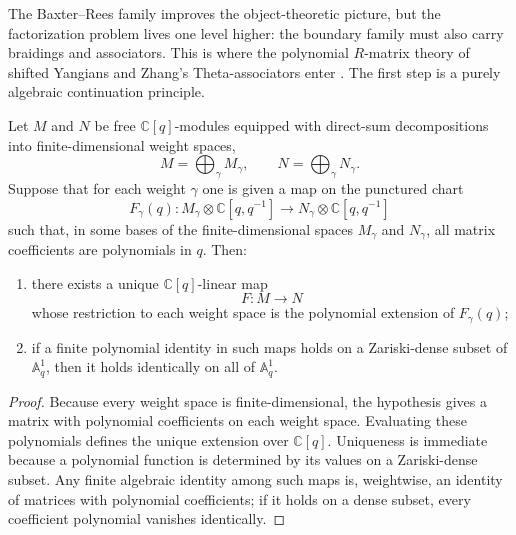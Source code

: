 The Baxter--Rees family improves the object-theoretic picture, but the
factorization problem lives one level higher: the boundary family must
also carry braidings and associators.  This is where the polynomial
$R$-matrix theory of shifted Yangians and Zhang's Theta-associators enter
\cite{HZ24,ZhangTheta24}.  The first step is a purely algebraic
continuation principle.

\begin{lemma}
\ClaimStatusProvedHere
\label{lem:weightwise-polynomial-continuation}
Let $M$ and $N$ be free $\mathbb C[q]$-modules equipped with direct-sum
decompositions into finite-dimensional weight spaces,
\begin{equation}
M=\bigoplus_{\gamma} M_\gamma,
\qquad N=\bigoplus_{\gamma} N_\gamma.
\end{equation}
Suppose that for each weight $\gamma$ one is given a map on the punctured
chart
\begin{equation}
F_\gamma(q):M_\gamma\otimes \mathbb C[q,q^{-1}]
\longrightarrow N_\gamma\otimes \mathbb C[q,q^{-1}]
\end{equation}
such that, in some bases of the finite-dimensional spaces $M_\gamma$ and
$N_\gamma$, all matrix coefficients are polynomials in $q$.  Then:
\begin{enumerate}
    \item there exists a unique $\mathbb C[q]$-linear map
    \begin{equation}
    F:M\to N
    \end{equation}
    whose restriction to each weight space is the polynomial extension of
    $F_\gamma(q)$;
    \item if a finite polynomial identity in such maps holds on a
    Zariski-dense subset of $\mathbb A^1_q$, then it holds identically on
    all of $\mathbb A^1_q$.
\end{enumerate}
\end{lemma}

\begin{proof}
Because every weight space is finite-dimensional, the hypothesis gives a
matrix with polynomial coefficients on each weight space.  Evaluating
these polynomials defines the unique extension over $\mathbb C[q]$.
Uniqueness is immediate because a polynomial function is determined by its
values on a Zariski-dense subset.  Any finite algebraic identity among
such maps is, weightwise, an identity of matrices with polynomial
coefficients; if it holds on a dense subset, every coefficient polynomial
vanishes identically.
\end{proof}

